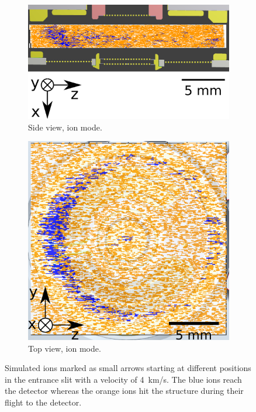 	\begin{figure}[h] %
		\begin{subfigure}[t]{.5\textwidth}
			\centering
			\includegraphics[width=.8\textwidth]{Experiments/PFMEntrance_Side_iSim.png}
			\caption{Side view, ion mode.}
		\end{subfigure}
		\begin{subfigure}[t]{.5\textwidth}
			\centering
			\includegraphics[width=.8\textwidth]{Experiments/PFMEntrance_Top_iSim.png}
			\caption{Top view, ion mode.}
		\end{subfigure}
		\caption{Simulated ions marked as small arrows starting at different positions in the entrance slit with a velocity of 4~km/s. The blue ions reach the detector whereas the orange ions hit the structure during their flight to the detector.}
		\label{fig:PFMentrSideTopSimiMode}
	\end{figure}
